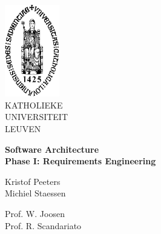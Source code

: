 \thispagestyle{empty}
\begin{flushleft}
\includegraphics[height=40mm]{figs/sedes_2.jpg}\\
\small
KATHOLIEKE\\ UNIVERSITEIT\\ LEUVEN
\end{flushleft}


\begin{center}
\textbf{Software Architecture} \\
\LARGE
\textbf{Phase I: Requirements Engineering}
\end{center}


\begin{flushleft}
\small
Kristof Peeters \\
Michiel Staessen\\
\end{flushleft}

\begin{flushleft}
Prof. W. Joosen \\
Prof. R. Scandariato \\
\end{flushleft}
